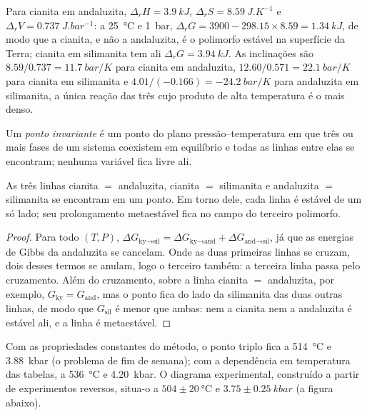 Para cianita em andaluzita, $\Delta_r H = \qty{3.9}{kJ}$, $\Delta_r S =
\qty{8.59}{J.K^{-1}}$ e $\Delta_r V = \qty{0.737}{J.bar^{-1}}$: a \qty{25}{\celsius}
e \qty{1}{bar}, $\Delta_r G = 3900 - 298.15\times8.59 = \qty{+1.34}{kJ}$, de modo que a cianita,
e não a andaluzita, é o polimorfo estável na superfície da Terra; cianita em silimanita tem
ali $\Delta_r G = \qty{+3.94}{kJ}$. As inclinações são $8.59/0.737 = \qty{11.7}{bar/K}$ para
cianita em andaluzita, $12.60/0.571 = \qty{22.1}{bar/K}$ para cianita em silimanita e
$4.01/(-0.166) = \qty{-24.2}{bar/K}$ para andaluzita em silimanita, a única reação das
três cujo produto de alta temperatura é o mais denso.

\begin{definition}\label{def:b2:metamorphic-facies:invariant}
Um \emph{ponto invariante} é um ponto do
plano pressão--temperatura em que três ou mais fases de um sistema coexistem em
equilíbrio e todas as linhas  entre elas se encontram; nenhuma variável fica livre ali.
\end{definition}

\begin{proposition}\label{prop:b2:metamorphic-facies:triple}
As três linhas cianita $=$ andaluzita, cianita $=$ silimanita e andaluzita $=$
silimanita se encontram em um ponto. Em torno dele, cada linha é estável de um só lado; seu
prolongamento metaestável fica no campo do terceiro polimorfo.
\end{proposition}

\begin{proof}
Para todo $(T, P)$, $\Delta G_{\text{ky}\to\text{sil}} = \Delta G_{\text{ky}\to\text{and}} +
\Delta G_{\text{and}\to\text{sil}}$, já que as energias de Gibbs da andaluzita se cancelam. Onde
as duas primeiras linhas se cruzam, dois desses termos se anulam, logo o terceiro também: a terceira
linha passa pelo cruzamento. Além do cruzamento, sobre a linha cianita $=$ andaluzita,
por exemplo, $G_{\text{ky}} = G_{\text{and}}$, mas o ponto fica do lado da silimanita das
duas outras linhas, de modo que $G_{\text{sil}}$ é menor que ambas: nem a cianita nem a andaluzita
é estável ali, e a linha é metaestável.
\end{proof}

Com as propriedades constantes do método, o ponto triplo fica a
\qty{514}{\celsius} e \qty{3.88}{kbar} (o problema de fim de semana); com a dependência
em temperatura das tabelas, a \qty{536}{\celsius} e \qty{4.20}{kbar}. O diagrama
experimental, construído a partir de experimentos reversos, situa-o a $504 \pm \qty{20}{\celsius}$ e
$3.75 \pm \qty{0.25}{kbar}$ (a figura abaixo).


